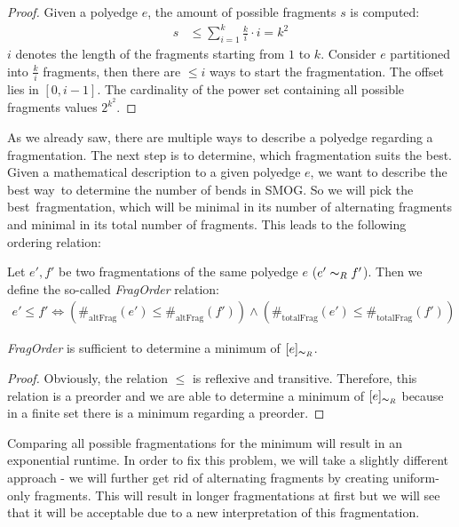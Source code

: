 \begin{proof}
	Given a polyedge $e$, the amount of possible fragments $s$ is computed:
	\begin{align*}
	s &\leq \sum_{i=1}^k \frac{k}{i} \cdot i = k^2
	\end{align*}
	$i$ denotes the length of the fragments starting from $1$ to $k$. Consider $e$ partitioned into $\frac{k}{i}$ fragments, then there are $\leq i$ ways to start the fragmentation. The offset lies in $[0,i-1]$. The cardinality of the power set containing all possible fragments values $2^{k^2}$.
\end{proof}
As we already saw, there are multiple ways to describe a polyedge regarding a fragmentation. The next step is to determine, which fragmentation suits the best. Given a mathematical description to a given polyedge $e$, we want to describe the \grqq best way\grqq~to determine the number of bends in SMOG. So we will pick the \grqq best\grqq~fragmentation, which will be minimal in its number of alternating fragments and minimal in its total number of fragments. This leads to the following ordering relation:
\begin{definition}\label{def:ord_rel}
	Let $e',f'$ be two fragmentations of the same polyedge $e$ ($e' \thicksim_R f'$). Then we define the so-called \textit{FragOrder} relation:
	\begin{align*}
	e' \leq f' \Leftrightarrow \left(\#_{\text{altFrag}}(e') \leq \#_{\text{altFrag}}(f')\right) \wedge \left(\#_{\text{totalFrag}}(e') \leq \#_{\text{totalFrag}}(f')\right)
	\end{align*}
\end{definition}
\begin{lemma}
	\textit{FragOrder }is sufficient to determine a minimum of $[e]_{\thicksim_R}$. 
\end{lemma}
\begin{proof}
	Obviously, the relation $\leq$ is reflexive and transitive. Therefore, this relation is a preorder and we are able to determine a minimum of $[e]_{\thicksim_R}$ because in a finite set there is a minimum regarding a preorder.
\end{proof}
Comparing all possible fragmentations for the minimum will result in an exponential runtime. In order to fix this problem, we will take a slightly different approach - we will further get rid of alternating fragments by creating uniform-only fragments. This will result in longer fragmentations at first but we will see that it will be acceptable due to a new interpretation of this fragmentation.\\
